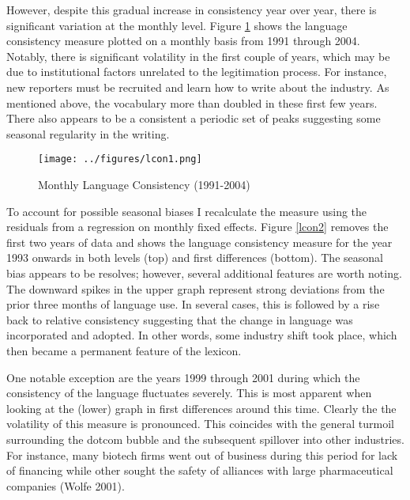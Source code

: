 However, despite this gradual increase in consistency year over year, there is significant variation at the monthly level. Figure \ref{lcon1} shows the language consistency measure plotted on a monthly basis from 1991 through 2004. Notably, there is significant volatility in the first couple of years, which may be due to institutional factors unrelated to the legitimation process. For instance, new reporters must be recruited and learn how to write about the industry. As mentioned above, the vocabulary more than doubled in these first few years. There also appears to be a consistent a periodic set of peaks suggesting some seasonal regularity in the writing.

\begin{landscape}
\begin{figure}[p!]
\begin{center}
\texttt{[image: ../figures/lcon1.png]}
\caption[Monthly Language Consistency (1991-2004)]{Monthly Language Consistency (1991-2004)\label{lcon1}}
\end{center}
\end{figure}
\end{landscape}

To account for possible seasonal biases I recalculate the measure using the residuals from a regression on monthly fixed effects. Figure \ref{lcon2} removes the first two years of data and shows the language consistency measure for the year 1993 onwards in both levels (top) and first differences (bottom). The seasonal bias appears to be resolves; however, several additional features are worth noting. The downward spikes in the upper graph represent strong deviations from the prior three months of language use. In several cases, this is followed by a rise back to relative consistency suggesting that the change in language was incorporated and adopted. In other words, some industry shift took place, which then became a permanent feature of the lexicon.

One notable exception are the years 1999 through 2001 during which the consistency of the language fluctuates severely. This is most apparent when looking at the (lower) graph in first differences around this time. Clearly the the volatility of this measure is pronounced. This coincides with the general turmoil surrounding the dotcom bubble and the subsequent spillover into other industries. For instance, many biotech firms went out of business during this period for lack of financing while other sought the safety of alliances with large pharmaceutical companies (Wolfe 2001).

